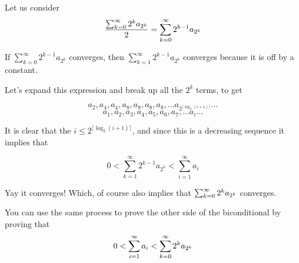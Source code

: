 Let us consider 
\[\frac{\sum_{k = 0}^{\infty} 2^ka_{2^k}}{2} = \sum_{k = 0}^{\infty} 2^{k-1}a_{2^k}\]

If $\sum_{k = 0}^{\infty} 2^{k-1}a_{2^k}$ converges, then $\sum_{k = 1}^{\infty} 2^{k-1}a_{2^k}$
converges because it is off by a constant.

Let's expand this expression and break up all the $2^k$ terms, to get

\[a_2, a_4, a_4, a_8, a_8, a_8, a_8, \ldots a_{2^{\lceil \log_2(i + 1) \rceil}} \ldots\]
\[a_1, a_2, a_3, a_4, a_5, a_6, a_7, \ldots a_i \ldots\]

It is clear that the $i \leq 2^{\lceil \log_2(i + 1) \rceil}$, and since this is a decreasing sequence it implies that 

\[0 < \sum_{k = 1}^{\infty} 2^{k-1}a_{2^k} < \sum_{i = 1}^\infty a_i\]

Yay it converges! Which, of course also implies that $\sum_{k = 0}^{\infty} 2^ka_{2^k}$ converges.

You can use the same process to prove the other side of the biconditional by proving that \[0 < \sum_{i = 1}^\infty a_i < \sum_{k = 0}^{\infty} 2^ka_{2^k}\]
